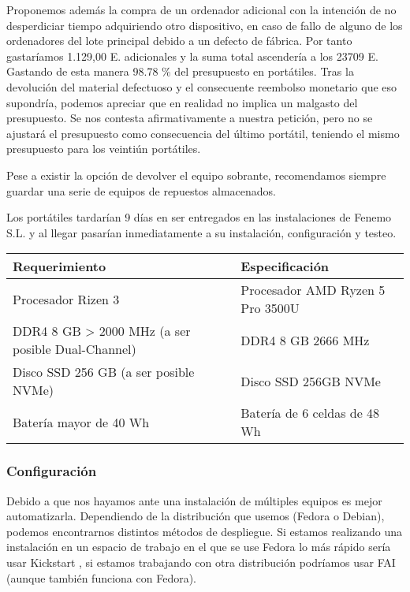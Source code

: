 \documentclass[11pt]{article}
\begin{document}
Proponemos además la compra de un ordenador adicional con la intención de no desperdiciar tiempo adquiriendo otro dispositivo, en caso de fallo de alguno de los ordenadores del lote principal debido a un defecto de fábrica. Por tanto gastaríamos 1.129,00 E. adicionales y la suma total ascendería a los 23709 E. Gastando de esta manera 98.78 \% del presupuesto en portátiles. Tras la devolución del material defectuoso y el consecuente reembolso monetario que eso supondría, podemos apreciar que en realidad no implica un malgasto del presupuesto. Se nos contesta afirmativamente a nuestra petición, pero no se ajustará el presupuesto como consecuencia del último portátil, teniendo el mismo presupuesto para los veintiún portátiles.

Pese a existir la opción de devolver el equipo sobrante, recomendamos siempre guardar una serie de equipos de repuestos almacenados.

Los portátiles tardarían 9 días en ser entregados en las instalaciones de Fenemo S.L. y al llegar pasarían inmediatamente a su instalación, configuración y testeo.

\begin{adjustbox}{width={\textwidth},keepaspectratio}
\centering
\begin{center}
\begin{tabular}{ll}
Requerimiento & Especificación\\
\hline
Procesador Rizen 3 & Procesador AMD Ryzen 5 Pro 3500U\\
DDR4 8 GB > 2000 MHz (a ser posible Dual-Channel) & DDR4 8 GB 2666 MHz\\
Disco SSD 256 GB (a ser posible NVMe) & Disco SSD 256GB NVMe\\
Batería mayor de 40 Wh & Batería de 6 celdas de 48 Wh\\
\end{tabular}
\end{center}
\end{adjustbox}

\subsubsection{Configuración}
\label{sec:org1732f45}

Debido a que nos hayamos ante una instalación de múltiples equipos es mejor automatizarla. Dependiendo de la distribución que usemos (Fedora o Debian), podemos encontrarnos distintos métodos de despliegue. Si estamos realizando una instalación en un espacio de trabajo en el que se use Fedora lo más rápido sería usar Kickstart \cite{red2020}, si estamos trabajando con otra distribución podríamos usar FAI \cite{fai2019} (aunque también funciona con Fedora).
\end{document}
